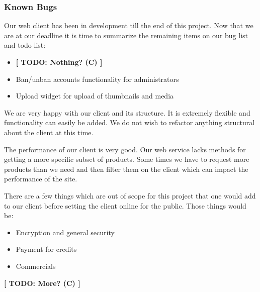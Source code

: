 \subsubsection{Known Bugs}
Our web client has been in development till the end of this project. Now that we are at our deadline it is time to summarize the remaining items on our bug list and todo list:

\begin{itemize}
\item \textbf{[ TODO: Nothing? (C) ]}
\end{itemize}

\begin{itemize}
\item Ban/unban accounts functionality for administrators
\item Upload widget for upload of thumbnails and media
\end{itemize}

We are very happy with our client and its structure. It is extremely flexible and functionality can easily be added. We do not wish to refactor anything structural about the client at this time.

The performance of our client is very good. Our web service lacks methods for getting a more specific subset of products. Some times we have to request more products than we need and then filter them on the client which can impact the performance of the site.

There are a few things which are out of scope for this project that one would add to our client before setting the client online for the public. Those things would be:
\begin{itemize}
\item Encryption and general security
\item Payment for credits
\item Commercials
\end{itemize}
\textbf{[ TODO: More? (C) ]}